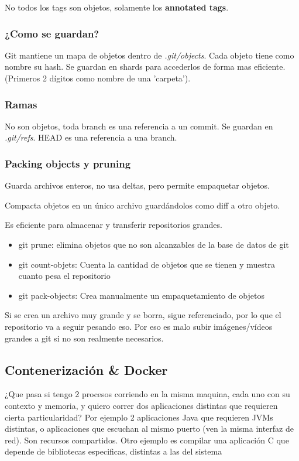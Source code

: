 \documentclass[titlepage,a4paper]{article}
\begin{document}
No todos los tags son objetos, solamente los \textbf{annotated tags}.

\subsubsection*{¿Como se guardan?}
Git mantiene un mapa de objetos dentro de \emph{.git/objects}. Cada objeto tiene como nombre su hash. Se guardan en shards para accederlos de forma mas eficiente. (Primeros 2 dígitos como nombre de una 'carpeta').

\subsubsection*{Ramas}
No son objetos, toda branch es una referencia a un commit. Se guardan en \emph{.git/refs}. HEAD es una referencia a una branch.

\subsubsection*{Packing objects y pruning}
Guarda archivos enteros, no usa deltas, pero permite empaquetar objetos.

Compacta objetos en un único archivo guardándolos como diff a otro objeto.

Es eficiente para almacenar y transferir repositorios grandes.

\begin{itemize}
    \item git prune: elimina objetos que no son alcanzables de la base de datos de git
    \item git count-objets: Cuenta la cantidad de objetos que se tienen y muestra cuanto pesa el repositorio
    \item git pack-objects: Crea manualmente un empaquetamiento de objetos
\end{itemize}

Si se crea un archivo muy grande y se borra, sigue referenciado, por lo que el repositorio va a seguir pesando eso. Por eso es malo subir imágenes/vídeos grandes a git si no son realmente necesarios.

\subsection{Contenerización \& Docker}

¿Que pasa si tengo 2 procesos corriendo en la misma maquina, cada uno con su contexto y memoria, y quiero correr dos aplicaciones distintas que requieren cierta particularidad?
Por ejemplo 2 aplicaciones Java que requieren JVMs distintas, o aplicaciones que escuchan al mismo puerto (ven la misma interfaz de red). Son recursos compartidos. Otro ejemplo es compilar una aplicación C que depende de bibliotecas especificas, distintas a las del sistema
\end{document}
